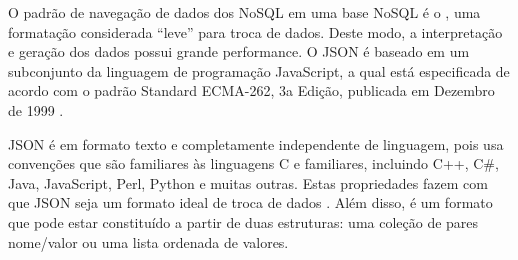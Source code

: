 O padrão de navegação de dados dos NoSQL em uma base NoSQL é o  , uma formatação considerada “leve” para troca de dados. Deste modo, a interpretação e geração dos dados possui grande performance. O JSON é baseado em um subconjunto da linguagem de programação JavaScript, a qual está especificada de acordo com o padrão Standard ECMA-262, 3a Edição, publicada em Dezembro de 1999 \cite{JSON}. 

JSON é em formato texto e completamente independente de linguagem, pois usa convenções que são familiares às linguagens C e familiares, incluindo C++, C\#, Java, JavaScript, Perl, Python e muitas outras. Estas propriedades fazem com que JSON seja um formato ideal de troca de dados \cite{JSON}. Além disso, é um formato que pode estar constituído a partir de duas estruturas: uma coleção de pares nome/valor ou uma lista ordenada de valores.